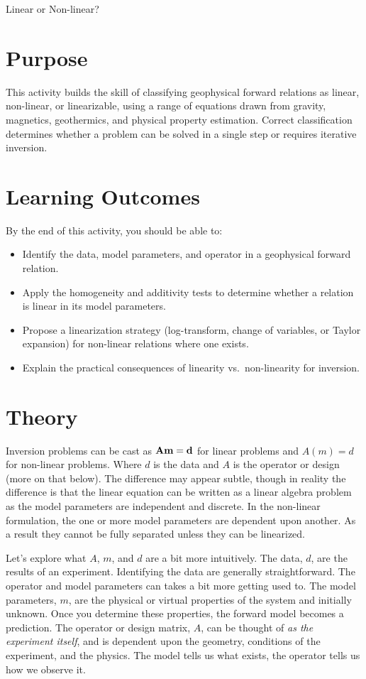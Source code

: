 \begin{activity}{Linear or Non-linear?}

\section*{Purpose}

This activity builds the skill of classifying geophysical forward relations as linear, non-linear, or linearizable, using a range of equations drawn from gravity, magnetics, geothermics, and physical property estimation. Correct classification determines whether a problem can be solved in a single step or requires iterative inversion.

\section*{Learning Outcomes}

By the end of this activity, you should be able to:
\begin{itemize}
  \item Identify the data, model parameters, and operator in a geophysical forward relation.
  \item Apply the homogeneity and additivity tests to determine whether a relation is linear in its model parameters.
  \item Propose a linearization strategy (log-transform, change of variables, or Taylor expansion) for non-linear relations where one exists.
  \item Explain the practical consequences of linearity vs.\ non-linearity for inversion.
\end{itemize}

\section{Theory}

Inversion problems can be cast as \(\vb{A}\vb{m} = \vb{d}\) for linear problems and \(A(m) = d\) for non-linear problems.  Where \(d\) is the data and \(A\) is the operator or design (more on that below).  The difference may appear subtle, though in reality the difference is that the linear equation can be written as a linear algebra problem as the model parameters are independent and discrete.  In the non-linear formulation, the one or more model parameters are dependent upon another.  As a result they cannot be fully separated unless they can be linearized.

Let's explore what \(A\), \(m\), and \(d\) are a bit more intuitively.
The data, \(d\), are the results of an experiment.  Identifying the data are generally straightforward.  The operator and model parameters can takes a bit more getting used to.  The model parameters, \(m\), are the physical or virtual properties of the system and initially unknown.  Once you determine these properties, the forward model becomes a prediction.  The operator or design matrix, \(A\), can be thought of \emph{as the experiment itself}, and is dependent upon the geometry, conditions of the experiment, and the physics.  The model tells us what exists, the operator tells us how we observe it.


\end{activity}

